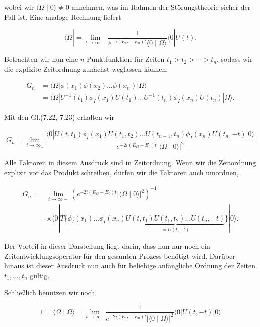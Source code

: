 \documentclass[10pt, letterpaper]{article}
\begin{document}
wobei wir $\langle\Omega \mid 0\rangle \neq 0$ annehmen, was im Rahmen der Störungstheorie sicher der Fall ist. Eine analoge Rechnung liefert

$$
\langle\Omega|=\lim _{t \rightarrow \infty-} \frac{1}{e^{-i\left(E_{\Omega}-E_{0}\right) t}\langle 0 \mid \Omega\rangle}\langle 0| U(t) .
$$

Betrachten wir nun eine $n$-Punktfunktion für Zeiten $t_{1}>t_{2}>\cdots>t_{n}$, sodass wir die explizite Zeitordnung zunächst weglassen können,

$$
\begin{aligned}
G_{n} & =\langle\Omega| \phi\left(x_{1}\right) \phi\left(x_{2}\right) \ldots \phi\left(x_{n}\right)|\Omega\rangle \\
& =\langle\Omega| U^{-1}\left(t_{1}\right) \phi_{I}\left(x_{1}\right) U\left(t_{1}\right) \ldots U^{-1}\left(t_{n}\right) \phi_{I}\left(x_{n}\right) U\left(t_{n}\right)|\Omega\rangle .
\end{aligned}
$$

Mit den Gl.(7.22, 7.23) erhalten wir

$$
G_{n}=\lim _{t \rightarrow \infty_{-}} \frac{\langle 0| U\left(t, t_{1}\right) \phi_{I}\left(x_{1}\right) U\left(t_{1}, t_{2}\right) \ldots U\left(t_{n-1}, t_{n}\right) \phi_{I}\left(x_{n}\right) U\left(t_{n},-t\right)|0\rangle}{e^{-2 i\left(E_{\Omega}-E_{0}\right) t}|\langle\Omega \mid 0\rangle|^{2}}
$$

Alle Faktoren in diesem Ausdruck sind in Zeitordnung. Wenn wir die Zeitordnung explizit vor das Produkt schreiben, dürfen wir die Faktoren auch umordnen,

$$
\begin{aligned}
G_{n}= & \lim _{t \rightarrow \infty-}\left(e^{-2 i\left(E_{\Omega}-E_{0}\right) t}|\langle\Omega \mid 0\rangle|^{2}\right)^{-1} \\
& \times\langle 0| T\{\phi_{I}\left(x_{1}\right) \ldots \phi_{I}\left(x_{n}\right) \underbrace{U\left(t, t_{1}\right) U\left(t_{1}, t_{2}\right) \ldots U\left(t_{n},-t\right)}_{=U(t,-t)}\}|0\rangle .
\end{aligned}
$$

Der Vorteil in dieser Darstellung liegt darin, dass nun nur noch ein Zeitentwicklungsoperator für den gesamten Prozess benötigt wird. Darüber hinaus ist dieser Ausdruck nun auch für beliebige anfängliche Ordnung der Zeiten $t_{1}, \ldots, t_{n}$ gültig.

Schließlich benutzen wir noch

$$
1=\langle\Omega \mid \Omega\rangle=\lim _{t \rightarrow \infty_{-}} \frac{1}{e^{-2 i\left(E_{\Omega}-E_{0}\right) t}|\langle 0 \mid \Omega\rangle|^{2}}\langle 0| U(t,-t)|0\rangle
$$
\end{document}
